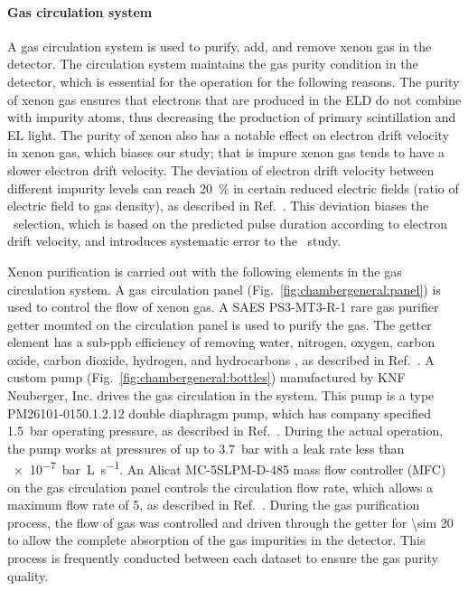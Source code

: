\paragraph{Gas circulation system}
A gas circulation system is used to purify, add, and remove xenon gas in the detector. The circulation system %
maintains the gas purity condition in the detector, which is essential for the operation for the following reasons. %
The purity of xenon gas ensures that electrons that are produced in the ELD do not combine with impurity atoms, thus decreasing the production of primary scintillation and EL light. The purity of xenon also has a notable effect on electron drift velocity in xenon gas, which biases our study; that is impure xenon gas tends to have a slower electron drift velocity. The deviation of electron drift velocity between different impurity levels can reach \SI{20}{\percent} in certain reduced electric fields (ratio of electric field to gas density), as described in Ref.~\cite{Brooks1982}. This deviation biases the \ees\ selection, which is based on the predicted pulse duration according to electron drift velocity, and introduces systematic error to the \ees\ study.

Xenon purification is carried out with the following elements in the gas circulation system. A gas circulation panel (Fig.~\ref{fig:chambergeneral:panel}) is used to control the flow of xenon gas. A SAES PS3-MT3-R-1 rare gas purifier getter mounted on the circulation panel is used to purify the gas. The getter element has a sub-ppb efficiency of removing water, nitrogen, oxygen, carbon oxide, carbon dioxide, hydrogen, and hydrocarbons%
, as described in Ref.~\cite{SAESgetters2002}.  A custom pump (Fig.~\ref{fig:chambergeneral:bottles}) manufactured by KNF Neuberger, Inc. drives the gas circulation in the system. This pump is a type PM26101-0150.1.2.12 double diaphragm pump, which has company specified \SI{1.5}{\bar} operating pressure, as described in Ref.~\cite{KNFNeuberger}. During the actual operation, the pump works at pressures of up to \SI{3.7}{\bar} with a leak rate less than \SI{e-7}{\bar\liter\per\s}. An Alicat MC-5SLPM-D-485 mass flow controller (MFC) on the gas circulation panel controls the circulation flow rate, which allows a maximum flow rate of \SI{5}{\slpm}, as described in Ref.~\cite{AlicatScientific}. During the gas purification process, the flow of gas was controlled and driven through the getter for \SI{\sim 20}{\min} to allow the complete absorption of the gas impurities in the detector. This process is frequently conducted between each dataset to ensure the gas purity quality. 

